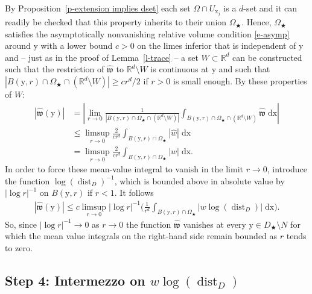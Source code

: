 \documentclass[10pt,leqno]{amsart}
\theoremstyle{definition}
\numberwithin{equation}{section}
\begin{document}
By Proposition~\ref{p-extension implies dset} each set $\Omega
\cap U_{{{\mathrm x}}_j}$ is a $d$-set and it can readily be checked that this property
inherits to their union $\Omega_\bigstar$. Hence, $\Omega_\bigstar$ satisfies
the asymptotically nonvanishing relative volume condition \eqref{e-asymp} around
${{\mathrm y}}$ with a lower bound $c>0$ on the limes inferior that is independent of ${{\mathrm y}}$
and -- just as in the proof of Lemma~\ref{l-trace} -- a set $W \subset {{\mathbb R}}^d$ can
be constructed such that the restriction of $\widehat{{\mathfrak w}}$ to ${{\mathbb R}}^d \setminus W$
is continuous at ${{\mathrm y}}$ and such that $|B({{\mathrm y}},r) \cap \Omega_\bigstar \cap ({{\mathbb R}}^d
\setminus W)| \geq cr^d/2$ if $r>0$ is small enough. By these properties of
$W$:
\begin{align*}
 |\widehat{{\mathfrak w}}({{\mathrm y}})| 
&= \left|\lim_{r \to 0} \frac{1}{|B({{\mathrm y}},r) \cap \Omega_\bigstar \cap
({{\mathbb R}}^d \setminus W)|} \int_{B({{\mathrm y}},r) \cap \Omega_\bigstar \cap ({{\mathbb R}}^d \setminus
W)} 
\widehat{{\mathfrak w}} \; {{\mathrm d}} {{\mathrm x}} \right| \\
&\leq \limsup_{r \to 0} \frac{2}{cr^d} \int_{B({{\mathrm y}},r) \cap \Omega_\bigstar}
|\widehat{w}| \; {{\mathrm d}} {{\mathrm x}} \\
&= \limsup_{r \to 0} \frac{2}{cr^d} \int_{B({{\mathrm y}},r) \cap \Omega_\bigstar}
|w| \; {{\mathrm d}} {{\mathrm x}}.
\end{align*}
In order to force these mean-value integral to vanish in the limit $r \to 0$,
introduce the function $\log({\operatorname{dist}}_D)^{-1}$, which is bounded above in absolute
value by $|\log r|^{-1}$ on $B({{\mathrm y}},r)$ if $r < 1$. It follows
\begin{align} \label{e-estimate_tracewidehat}
|\widehat{{\mathfrak w}}({{\mathrm y}})| \leq c \limsup_{r \to 0} |\log r|^{-1} 
\bigg(\frac{1}{r^d} \int_{B({{\mathrm y}},r) \cap \Omega_\bigstar} 
|w \log({\operatorname{dist}}_D)| \; {{\mathrm d}} {{\mathrm x}} \bigg).
\end{align}
So, since $|\log r|^{-1} \to 0$ as $r \to 0$ the function $\widehat{{\mathfrak w}}$
vanishes at every ${{\mathrm y}} \in D_\bigstar \setminus N$ for which the mean value
integrals on the right-hand side remain bounded as $r$ tends to zero.

\subsection*{Step 4: Intermezzo on $w \log({\operatorname{dist}}_D)$}
\end{document}
